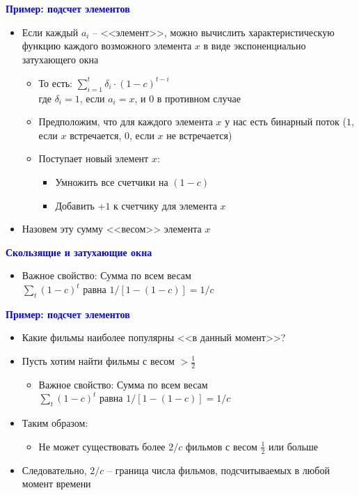 \documentclass[landscape]{slides}
\begin{document}
\begin{normalsize}
\begin{slide}
\textbf{\textcolor{blue}{Пример: подсчет элементов}}

\begin{itemize}
\item Если каждый $a_i$ -- <<элемент>>, можно вычислить характеристическую функцию
каждого возможного элемента $x$ в виде экспоненциально затухающего окна
  \begin{itemize}
  \item То есть: $\sum_{i=1}^t \delta_i\cdot(1-c)^{t-i}$\\
  где $\delta_i=1$, если $a_i=x$, и $0$ в противном случае
  \item Предположим, что для каждого элемента $x$ у нас есть бинарный поток
  ($1$, если $x$ встречается, $0$, если $x$ не встречается)
  \item Поступает новый элемент $x$:
    \begin{itemize}
    \item Умножить все счетчики на $(1-c)$
    \item Добавить $+1$ к счетчику для элемента $x$
    \end{itemize}
  \end{itemize}
\item Назовем эту сумму <<весом>> элемента $x$
\end{itemize}
\end{slide}


\begin{slide}
\textbf{\textcolor{blue}{Скользящие и затухающие окна}}

\begin{itemize}
\item Важное свойство: Сумма по всем весам\\
$ \sum_t(1-c)^t $ равна $1/[1-(1-c)]=1/c$
\end{itemize}
\end{slide}


\begin{slide}
\textbf{\textcolor{blue}{Пример: подсчет элементов}}

\begin{itemize}
\item Какие фильмы наиболее популярны <<в данный момент>>?
\item Пусть хотим найти фильмы с весом $>\frac 12$
  \begin{itemize}
  \item Важное свойство: Сумма по всем весам\\
  $\sum_t(1-c)^t$ равна $1/[1-(1-c)]=1/c$
  \end{itemize}
\item Таким образом:
  \begin{itemize}
  \item Не может существовать более $2/c$ фильмов с весом $\frac 12$ или больше
  \end{itemize}
\item Следовательно, $2/c$ -- граница числа фильмов, подсчитываемых в любой момент времени
\end{itemize}
\end{slide}


\end{normalsize}
\end{document}
